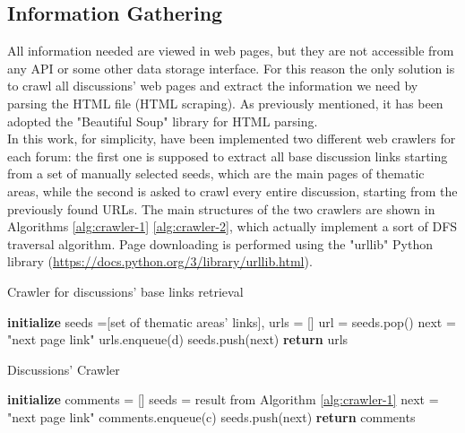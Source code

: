 \subsection{Information Gathering}

All information needed are viewed in web pages, but they are not accessible from any API or some other data storage interface. For this reason the only solution is to crawl all discussions' web pages and extract the information we need by parsing the \ac{HTML} file (\ac{HTML} scraping). As previously mentioned, it has been adopted the "Beautiful Soup" library for \ac{HTML} parsing.\\
In this work, for simplicity, have been implemented two different web crawlers for each forum: the first one is supposed to extract all base discussion links starting from a set of manually selected seeds, which are the main pages of thematic areas, while the second is asked to crawl every entire discussion, starting from the previously found URLs. The main structures of the two crawlers are shown in Algorithms \ref{alg:crawler-1} \ref{alg:crawler-2}, which actually implement a sort of \ac{DFS} traversal algorithm. Page downloading is performed using the "urllib" Python library (\url{https://docs.python.org/3/library/urllib.html}).

\begin{algorithm}
	\caption{Crawler for discussions' base links retrieval}
	\label{alg:crawler-1}
	\begin{algorithmic}[1]
		\State \textbf{initialize} seeds =[set of thematic areas' links], urls = []
		\State
		\State url = seeds.pop()
		\State next = "next page link"
		\State urls.enqueue(d)
		\EndFor
		\State seeds.push(next)
		\EndWhile
		\State \textbf{return} urls
	\end{algorithmic}
\end{algorithm}

\begin{algorithm}
	\caption{Discussions' Crawler}
	\label{alg:crawler-2}
	\begin{algorithmic}[1]
		\State \textbf{initialize} comments = []
		\State
		\State seeds = result from Algorithm \ref{alg:crawler-1}
		\State next = "next page link"
		\State comments.enqueue(c)
		\EndFor
		\State seeds.push(next)
		\EndWhile
		\State \textbf{return} comments
	\end{algorithmic}
\end{algorithm}

